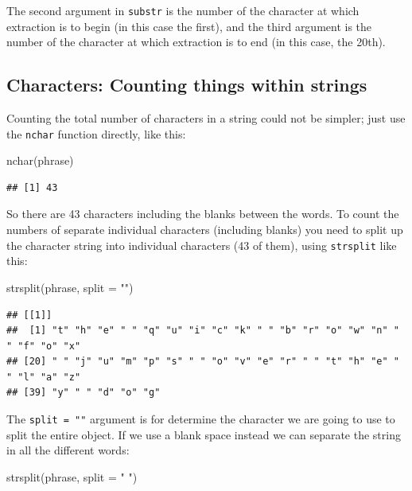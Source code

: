 \documentclass[
]{book}
\newenvironment{Shaded}{\begin{snugshade}}{\end{snugshade}}
\newcommand{\AttributeTok}[1]{\textcolor[rgb]{0.77,0.63,0.00}{#1}}
\newcommand{\FunctionTok}[1]{\textcolor[rgb]{0.00,0.00,0.00}{#1}}
\newcommand{\NormalTok}[1]{#1}
\newcommand{\StringTok}[1]{\textcolor[rgb]{0.31,0.60,0.02}{#1}}
\theoremstyle{definition}
\theoremstyle{definition}
\theoremstyle{definition}
\theoremstyle{definition}
\theoremstyle{remark}
\begin{document}
The second argument in \texttt{substr} is the number of the character at which extraction is to begin (in this case the first), and the third argument is the number of the character at which extraction is to end (in this case, the 20th).

\hypertarget{characters-counting-things-within-strings}{%
\subsection{Characters: Counting things within strings}\label{characters-counting-things-within-strings}}

Counting the total number of characters in a string could not be simpler; just use the \texttt{nchar} function directly, like this:

\begin{Shaded}
\begin{Highlighting}[]
\FunctionTok{nchar}\NormalTok{(phrase)}
\end{Highlighting}
\end{Shaded}

\begin{verbatim}
## [1] 43
\end{verbatim}

So there are 43 characters including the blanks between the words. To count the numbers of separate individual characters (including blanks) you need to split up the character string into individual characters (43 of them), using \texttt{strsplit} like this:

\begin{Shaded}
\begin{Highlighting}[]
\FunctionTok{strsplit}\NormalTok{(phrase, }\AttributeTok{split =} \StringTok{""}\NormalTok{)}
\end{Highlighting}
\end{Shaded}

\begin{verbatim}
## [[1]]
##  [1] "t" "h" "e" " " "q" "u" "i" "c" "k" " " "b" "r" "o" "w" "n" " " "f" "o" "x"
## [20] " " "j" "u" "m" "p" "s" " " "o" "v" "e" "r" " " "t" "h" "e" " " "l" "a" "z"
## [39] "y" " " "d" "o" "g"
\end{verbatim}

The \texttt{split\ =\ ""} argument is for determine the character we are going to use to split the entire object. If we use a blank space instead we can separate the string in all the different words:

\begin{Shaded}
\begin{Highlighting}[]
\FunctionTok{strsplit}\NormalTok{(phrase, }\AttributeTok{split =} \StringTok{" "}\NormalTok{)}
\end{Highlighting}
\end{Shaded}
\end{document}

